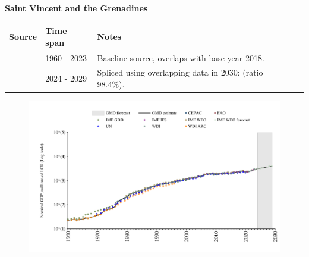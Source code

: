 \documentclass[12pt,a4paper,landscape]{article}
\begin{document}
\begin{adjustbox}{max totalsize={\paperwidth}{\paperheight},center}
\begin{minipage}[t][\textheight][t]{\textwidth}
\vspace*{0.5cm}
{}
\begin{center}
{\Large\bfseries Saint Vincent and the Grenadines}
\end{center}
\vspace{0.5cm}
\begin{table}[H]
\centering
\small
\begin{tabular}{|l|l|l|}
\hline
\textbf{Source} & \textbf{Time span} & \textbf{Notes} \\
\hline
\rowcolor{white}\cite{WDI}& 1960 - 2023 &Baseline source, overlaps with base year 2018.\\
\rowcolor{lightgray}\cite{IMF_WEO_forecast}& 2024 - 2029 &Spliced using overlapping data in 2030: (ratio = 98.4\%).\\
\hline
\end{tabular}
\end{table}
\begin{figure}[H]
\centering
\includegraphics[width=\textwidth,height=0.6\textheight,keepaspectratio]{graphs/VCT_nGDP.pdf}
\end{figure}
\end{minipage}
\end{adjustbox}
\end{document}
